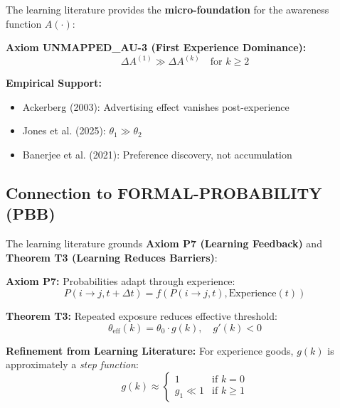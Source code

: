 \documentclass[11pt, a4paper]{article}
\begin{document}
\begin{tcolorbox}[colback=blue!5!white, colframe=blue!75!black,
    title=Integration: LIT-LEARNING $\leftrightarrow$ CORE-AWARE]

The learning literature provides the \textbf{micro-foundation} for the awareness function $A(\cdot)$:

\textbf{Axiom UNMAPPED_AU-3 (First Experience Dominance):}
\begin{equation}
\Delta A^{(1)} \gg \Delta A^{(k)} \quad \text{for } k \geq 2
\end{equation}

\textbf{Empirical Support:}
\begin{itemize}[nosep]
    \item Ackerberg (2003): Advertising effect vanishes post-experience
    \item Jones et al. (2025): $\theta_1 \gg \theta_2$
    \item Banerjee et al. (2021): Preference discovery, not accumulation
\end{itemize}

\end{tcolorbox}

\subsection{Connection to FORMAL-PROBABILITY (PBB)}

\begin{tcolorbox}[colback=blue!5!white, colframe=blue!75!black,
    title=Integration: LIT-LEARNING $\leftrightarrow$ FORMAL-PROBABILITY]

The learning literature grounds \textbf{Axiom P7 (Learning Feedback)} and \textbf{Theorem T3 (Learning Reduces Barriers)}:

\textbf{Axiom P7:} Probabilities adapt through experience:
\begin{equation}
P(i \to j, t+\Delta t) = f(P(i \to j, t), \text{Experience}(t))
\end{equation}

\textbf{Theorem T3:} Repeated exposure reduces effective threshold:
\begin{equation}
\theta_{\text{eff}}(k) = \theta_0 \cdot g(k), \quad g'(k) < 0
\end{equation}

\textbf{Refinement from Learning Literature:}
For experience goods, $g(k)$ is approximately a \textit{step function}:
\begin{equation}
g(k) \approx \begin{cases}
1 & \text{if } k = 0 \\
g_1 \ll 1 & \text{if } k \geq 1
\end{cases}
\end{equation}

\end{tcolorbox}
\end{document}
